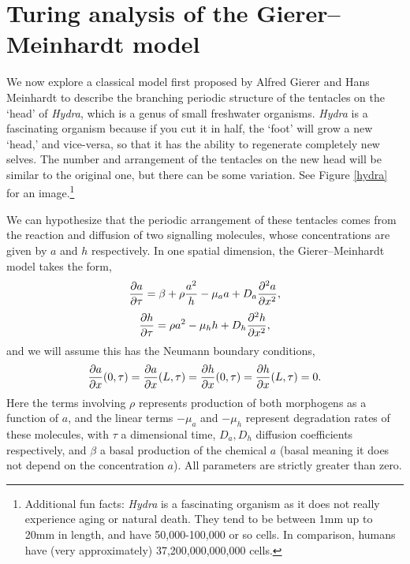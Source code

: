 \documentclass[a4paper,12pt]{article}
\begin{document}
 
%
\newcommand{\sol}[1]{\\ \hrule\hfill \\ \textcolor{blue}{\textbf{SOLUTION:}} #1 \\ \hrule\hfill}

\section*{Turing analysis of the Gierer--Meinhardt model}
    We now explore a classical model first proposed by Alfred Gierer and Hans Meinhardt to describe the branching periodic structure of the tentacles on the `head' of \emph{Hydra}, which is a genus of small freshwater organisms.  \emph{Hydra} is a fascinating organism because if you cut it in half, the `foot' will grow a new `head,' and vice-versa, so that it has the ability to regenerate completely new selves. The number and arrangement of the tentacles on the new head will be similar to the original one, but there can be some variation. See Figure \ref{hydra} for an image.\footnote{Additional fun facts: \emph{Hydra} is a fascinating organism as it does not really experience aging or natural death. They tend to be between 1mm up to 20mm in length, and have 50,000-100,000 or so cells. In comparison, humans have (very approximately) 37,200,000,000,000 cells.}
    
    We can hypothesize that the periodic arrangement of these tentacles comes from the reaction and diffusion of two signalling molecules, whose concentrations are given by $a$ and $h$ respectively. In one spatial dimension, the Gierer--Meinhardt model takes the form,
    \begin{equation}\label{a_eq}
    \pd{a}{\tau} = \beta+\rho \frac{a^2}{h} - \mu_a a + D_a \pdd{a}{x}, 
    \end{equation}
    \begin{equation}\label{h_eq}
        \pd{h}{\tau} = \rho a^2 - \mu_h h + D_h \pdd{h}{x},
    \end{equation}
    and we will assume this has the Neumann boundary conditions,
    \begin{equation}
        \pd{a}{x}(0,\tau) = \pd{a}{x}(L,\tau) = \pd{h}{x}(0,\tau) = \pd{h}{x}(L,\tau) = 0.
    \end{equation}
    Here the terms involving $\rho$ represents production of both morphogens as a function of $a$, and the linear terms $-\mu_a$ and $-\mu_h$ represent degradation rates of these molecules, with $\tau$ a dimensional time, $D_a, D_h$ diffusion coefficients respectively, and $\beta$ a basal production of the chemical $a$ (basal meaning it does not depend on the concentration $a$). All parameters are strictly greater than zero.
    
\end{document}
